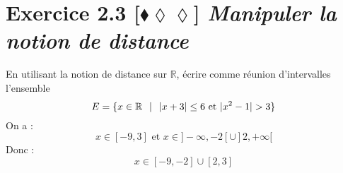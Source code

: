 \documentclass[10pt]{article}
\begin{document}
\section*{Exercice 2.3 [$\blacklozenge\lozenge\lozenge$] \emph{Manipuler la notion de distance}}
\begin{tcolorbox}[enhanced, width=7in, center, size=fbox, fontupper=\large, drop shadow southwest]
    En utilisant la notion de distance sur $\mathbb{R}$, écrire comme réunion d'intervalles l'ensemble
    \begin{equation*}
        E=\{x\in\mathbb{R} \hspace{0.25cm} | \hspace{0.25cm} |x+3| \leq 6 \text{ et } |x^2-1| > 3\}
    \end{equation*}
    On a :
    \begin{equation*}
        x\in[-9,3] \text{ et } x\in]-\infty, -2[\cup]2,+\infty[
    \end{equation*}
    Donc :
    \begin{equation*}
        x\in[-9,-2]\cup[2,3]
    \end{equation*}
\end{tcolorbox}
\end{document}
